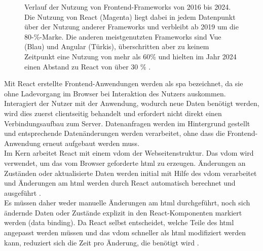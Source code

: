\begin{figure}[htbp]
    \caption[Verlauf der Nutzung von Frontend-Frameworks von 2016 bis 2024]{Verlauf der Nutzung von Frontend-Frameworks von 2016 bis 2024. Die Nutzung von React (Magenta) liegt dabei in jedem Datenpunkt über der Nutzung anderer Frameworks und verbleibt ab 2019 um die 80-\%-Marke. Die anderen meistgenutzten Frameworks sind Vue (Blau) und Angular (Türkis), überschritten aber zu keinem Zeitpunkt eine Nutzung von mehr als 60\% und hielten im Jahr 2024 einen Abstand zu React von über 30 \% \cite{tkrotoff2026frontendframeworkspopularity}.}
    \label{fig:102_frontend-framework-usage}
\end{figure}

Mit React erstellte Frontend-Anwendungen werden als \gls{spa} bezeichnet, da sie ohne Ladevorgang im Browser bei Interaktion des Nutzers auskommen. 
Interagiert der Nutzer mit der Anwendung, wodurch neue Daten benötigt werden, wird dies zuerst clientseitig behandelt und erfordert nicht direkt einen Verbindungsaufbau zum Server.
Datenanfragen werden im Hintergrund gestellt und entsprechende Datenänderungen werden verarbeitet, ohne dass die Frontend-Anwendung erneut aufgebaut werden muss. \\

Im Kern arbeitet React mit einem \gls{vdom} der Webseitenstruktur. Das \gls{vdom} wird verwendet, um das vom Browser geforderte \gls{html} zu erzeugen.
Änderungen an Zuständen oder aktualisierte Daten werden initial mit Hilfe des \gls{vdom} verarbeitet und Änderungen am \gls{html} werden durch React automatisch berechnet und ausgeführt \cite{hunt2013whydidwebuildreact}. \\

Es müssen daher weder manuelle Änderungen am \gls{html} durchgeführt, noch sich ändernde Daten oder Zustände explizit in den React-Komponenten markiert werden (data binding).
Da React selbst entscheidet, welche Teile des \gls{html} angepasst werden müssen und das \gls{vdom} schneller als \gls{html} modifiziert werden kann, reduziert sich die Zeit pro Änderung, die benötigt wird \cite{hunt2013whydidwebuildreact}. \\

